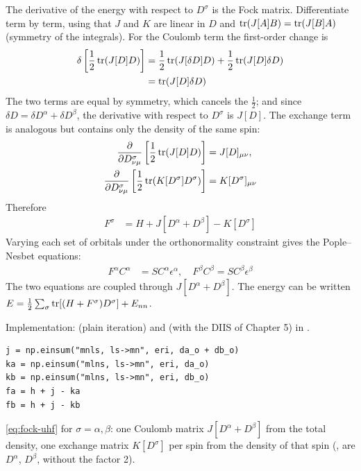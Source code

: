 The derivative of the energy with respect to $D^{\sigma}$ is the Fock matrix. Differentiate term by term, using that $J$ and $K$ are linear in $D$ and $\operatorname{tr}(J[A] B) = \operatorname{tr}(J[B] A)$ (symmetry of the integrals). For the Coulomb term the first-order change is
\begin{align*}
\delta \left[ \frac{1}{2} \operatorname{tr}(J[D] D) \right] &= \frac{1}{2} \operatorname{tr}(J[\delta D] D) + \frac{1}{2} \operatorname{tr}(J[D] \delta D) \\
&= \operatorname{tr}(J[D] \delta D)
\end{align*}
The two terms are equal by symmetry, which cancels the $\frac{1}{2}$; and since $\delta D = \delta D^\alpha + \delta D^\beta$, the derivative with respect to $D^{\sigma}$ is $J[D]$. The exchange term is analogous but contains only the density of the same spin:
\begin{align*}
\frac{\partial}{\partial D^\sigma_{\nu \mu}} \left[ \frac{1}{2} \operatorname{tr}(J[D] D) \right] &= J[D]_{\mu \nu}, \\
\frac{\partial}{\partial D^\sigma_{\nu \mu}} \left[ \frac{1}{2} \operatorname{tr}(K[D^\sigma] D^\sigma) \right] &= K[D^\sigma]_{\mu \nu}
\end{align*}
Therefore
\begin{align}\label{eq:fock-uhf}
F^\sigma &= H + J[D^\alpha + D^\beta] - K[D^\sigma]
\end{align}
Varying each set of orbitals under the orthonormality constraint gives the Pople--Nesbet equations:
\begin{align*}
F^\alpha C^\alpha &= S C^\alpha \epsilon^\alpha, \quad F^\beta C^\beta = S C^\beta \epsilon^\beta
\end{align*}
The two equations are coupled through $J[D^\alpha + D^\beta]$. The energy can be written $E = \frac{1}{2} \sum_{\sigma} \operatorname{tr}[(H + F^{\sigma}) D^{\sigma}] + E_{nn}$.

Implementation:  (plain iteration) and  (with the DIIS of Chapter 5) in .

\begin{codemap}
\begin{lstlisting}[frame=none, numbers=none, xleftmargin=0pt, backgroundcolor={}]
j = np.einsum("mnls, ls->mn", eri, da_o + db_o)
ka = np.einsum("mlns, ls->mn", eri, da_o)
kb = np.einsum("mlns, ls->mn", eri, db_o)
fa = h + j - ka
fb = h + j - kb
\end{lstlisting}
\eqref{eq:fock-uhf} for $\sigma = \alpha, \beta$: one Coulomb matrix $J[D^\alpha + D^\beta]$ from the total density, one exchange matrix $K[D^\sigma]$ per spin from the density of that spin (,  are $D^\alpha$, $D^\beta$, without the factor 2).
\end{codemap}

